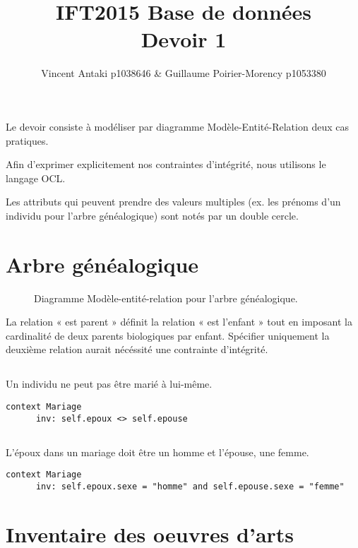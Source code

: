 \documentclass{article}
\title{IFT2015 Base de données \\ Devoir 1}
\author{Vincent Antaki p1038646 \& Guillaume Poirier-Morency p1053380}
\begin{document}
  \maketitle

  \abstract
  Le devoir consiste à modéliser par diagramme Modèle-Entité-Relation deux cas
  pratiques.

  Afin d'exprimer explicitement nos contraintes d'intégrité, nous utilisons le
  langage OCL.

  Les attributs qui peuvent prendre des valeurs multiples (ex. les prénoms d'un
  individu pour l'arbre généalogique) sont notés par un double cercle.

  \section{Arbre généalogique}

  \begin{sidewaysfigure}
  \begin{adjustbox}{max size={\textwidth}{\textheight}}
  
  \end{adjustbox}
  \caption{Diagramme Modèle-entité-relation pour l'arbre généalogique.}
  \end{sidewaysfigure}

  La relation « est parent » définit la relation « est l'enfant » tout en
  imposant la cardinalité de deux parents biologiques par enfant. Spécifier
  uniquement la deuxième relation aurait nécéssité une contrainte d'intégrité.

  \subsection{}
  Un individu ne peut pas être marié à lui-même.
  \begin{lstlisting}[language=OCL]
  context Mariage
      inv: self.epoux <> self.epouse
  \end{lstlisting}

  \subsection{}
  L'époux dans un mariage doit être un homme et l'épouse, une femme.
  \begin{lstlisting}[language=OCL]
  context Mariage
      inv: self.epoux.sexe = "homme" and self.epouse.sexe = "femme"
  \end{lstlisting}

  \section{Inventaire des oeuvres d'arts}
\end{document}
